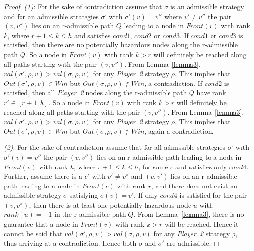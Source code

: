 \begin{proof}
	\textit{(1)}: For the sake of contradiction assume that $\sigma$ is an admissible strategy and for an admissible strategies $\sigma'$ with $\sigma'(v) = v''$ where $v' \neq v''$ the pair $(v,v'')$ lies on an r-admissible path $Q$ leading to a node in $\mathit{Front}(v)$ with rank $k$, where $r+1 \leq k \leq h$ and satisfies $cond1$, $cond2$ or $cond3$. If $cond1$ or $cond3$ is satisfied, then there are no potentially hazardous nodes along the r-admissible path $Q$. So a node in $\mathit{Front}(v)$ with rank $k > r$ will definitely be reached along all paths starting with the pair $(v,v'')$. From Lemma~\ref{lemma3}, $val(\sigma',\rho,v) > val(\sigma,\rho,v)$ for any \textit{Player~2} strategy $\rho$. This implies that $Out(\sigma',\rho,v) \in \mathit{Win}$ but $Out(\sigma,\rho,v) \notin \mathit{Win}$, a contradiction. If $cond2$ is satisfied, then all \textit{Player~2} nodes along the r-admissible path $Q$ have rank $r' \in [r+1,h]$. So a node in $\mathit{Front}(v)$ with rank $k > r$ will definitely be reached along all paths starting with the pair $(v,v'')$. From Lemma~\ref{lemma3}, $val(\sigma',\rho,v) > val(\sigma,\rho,v)$ for any \textit{Player~2} strategy $\rho$. This implies that $Out(\sigma',\rho,v) \in \mathit{Win}$ but $Out(\sigma,\rho,v) \notin \mathit{Win}$, again a contradiction.
	
	\textit{(2)}: For the sake of contradiction assume that for
	all admissible strategies $\sigma'$ with $\sigma'(v) = v''$ the pair
	$(v,v'')$ lies on an r-admissible path leading to a node in $\mathit{Front}(v)$
	with rank $k$, where $r+1 \leq k \leq h$, for some $r$ and satisfies
	only $cond4$. Further, assume there is a $v'$ with $v' \neq v''$ and
	$(v,v')$ lies on an r-admissible path leading to a node in $\mathit{Front}(v)$
	with rank $r$, and there does not exist an admissible strategy
	$\sigma$ satisfying $\sigma(v) = v'$. If only $cond4$ is satisfied
	for the pair $(v,v'')$, then there is at least one potentially
	hazardous node $u$ with $rank(u) = -1$ in the r-admissible path
	$Q$. From Lemma~\ref{lemma3}, there is no guarantee that a node in
	$\mathit{Front}(v)$ with rank $k > r$ will be reached. Hence it cannot be said that $val(\sigma',\rho,v) > val(\sigma,\rho,v)$ for any
	\textit{Player~2} strategy $\rho$, thus arriving at a
	contradiction. Hence both $\sigma$ and $\sigma'$ are admissible. 
\end{proof}

